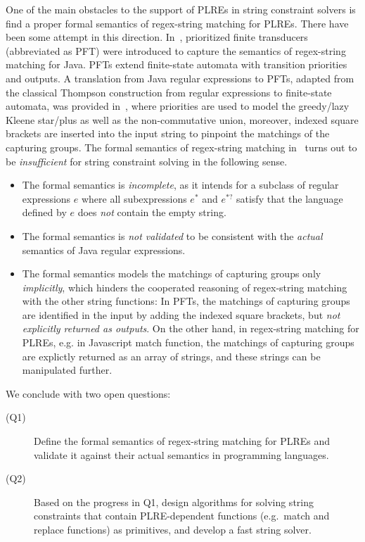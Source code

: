 {One of the main obstacles to the support of PLREs in string constraint solvers is find a proper formal semantics of regex-string matching for PLREs. There have been some attempt in this direction. In~\cite{BDM14,BM17}, prioritized finite transducers (abbreviated as PFT) were introduced to capture the semantics of regex-string matching for Java.  PFTs extend finite-state automata with transition priorities and outputs. A translation from Java regular expressions to PFTs, adapted from the classical Thompson construction from regular expressions to finite-state automata, was provided in~\cite{BDM14,BM17}, where priorities are used to model the greedy/lazy Kleene star/plus as well as the non-commutative union, moreover, indexed square brackets are inserted into the input string to pinpoint the matchings of the capturing groups.  The formal semantics of regex-string matching in~\cite{BDM14,BM17} turns out to be \emph{insufficient} for string constraint solving in the following sense.
\begin{itemize}
\item The formal semantics is \emph{incomplete}, as it intends for a subclass of regular expressions $e$ where all subexpressions $e^*$ and $e^{*?}$ satisfy that the language defined by $e$ does \emph{not} contain the empty string.
%
\item The formal semantics is \emph{not validated} to be consistent with the \emph{actual} semantics of Java regular expressions.
%
\item The formal semantics models the matchings of capturing groups only \emph{implicitly}, which hinders the cooperated reasoning of regex-string matching with the other string functions: In PFTs, the matchings of capturing groups are identified in the input by adding the indexed square brackets, but \emph{not explicitly returned as outputs}.  On the other hand, in regex-string matching for PLREs, e.g. in Javascript match function, the matchings of capturing groups are explictly returned as an array of strings, and these strings can be manipulated further.
\end{itemize}

We conclude with two open questions:
\begin{description}
    \item[(Q1)] Define the formal semantics of regex-string matching for PLREs and validate it against their actual semantics in programming languages.
    \item[(Q2)] Based on the progress in Q1, design algorithms for solving string constraints that contain PLRE-dependent functions (e.g.\ match and replace functions) as primitives, and develop a
        fast string solver.
\end{description}

}
